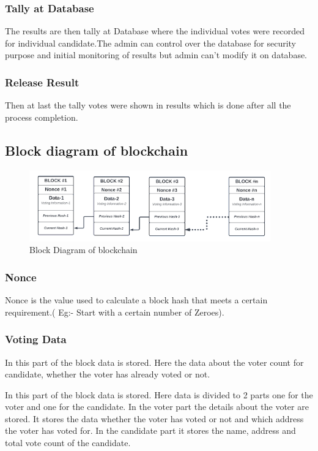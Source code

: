 \subsubsection{Tally at Database}
The results are then tally at Database where the individual votes were recorded for individual candidate.The admin can control over the database for security purpose and initial monitoring of results but admin can’t modify it on database.

\subsubsection{Release Result}
Then at last the tally votes were shown in results which is done after all the process completion.

\subsection{Block diagram of blockchain}

\begin{figure}[tbh] %
\begin{center}
	\includegraphics[width = 4.1in]{images/Block Diagram of blockchain.png}
	\caption{Block Diagram of blockchain} %
	\label{figSample1} %
\end{center}
\end{figure}

\subsubsection{Nonce}
Nonce is the value used to calculate a block hash that meets a certain requirement.( Eg:- Start with a certain number of Zeroes).

\subsubsection{Voting Data}
In this part of the block data is stored. Here the data about the voter count for candidate, whether the voter has already voted or not.\par 
In this part of the block data is stored. Here data is divided to 2 parts one for the voter and one for the candidate. In the voter part the details about the voter are stored. It stores the data whether the voter has voted or not and which address the voter has voted for. In the candidate part it stores the name, address and total vote count of the candidate.

